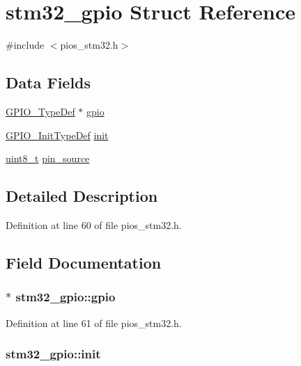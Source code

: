 \hypertarget{structstm32__gpio}{\section{stm32\-\_\-gpio Struct Reference}
\label{structstm32__gpio}
}


{\ttfamily \#include $<$pios\-\_\-stm32.\-h$>$}

\subsection*{Data Fields}
\begin{DoxyCompactItemize}
\item 
\hyperlink{struct_g_p_i_o___type_def}{G\-P\-I\-O\-\_\-\-Type\-Def} $\ast$ \hyperlink{structstm32__gpio_a3d54b128262b814ecf0ad412093b6402}{gpio}
\item 
\hyperlink{struct_g_p_i_o___init_type_def}{G\-P\-I\-O\-\_\-\-Init\-Type\-Def} \hyperlink{structstm32__gpio_ab4cf4debf63492af696cf1f340a42824}{init}
\item 
\hyperlink{stdint_8h_aba7bc1797add20fe3efdf37ced1182c5}{uint8\-\_\-t} \hyperlink{structstm32__gpio_a79c5a3ec6b45fc1a2c4921c81f79ca42}{pin\-\_\-source}
\end{DoxyCompactItemize}


\subsection{Detailed Description}


Definition at line 60 of file pios\-\_\-stm32.\-h.



\subsection{Field Documentation}
\hypertarget{structstm32__gpio_a3d54b128262b814ecf0ad412093b6402}{
\subsubsection[{gpio}]{$\ast$ stm32\-\_\-gpio\-::gpio}}\label{structstm32__gpio_a3d54b128262b814ecf0ad412093b6402}


Definition at line 61 of file pios\-\_\-stm32.\-h.

\hypertarget{structstm32__gpio_ab4cf4debf63492af696cf1f340a42824}{
\subsubsection[{init}]{ stm32\-\_\-gpio\-::init}}\label{structstm32__gpio_ab4cf4debf63492af696cf1f340a42824}


